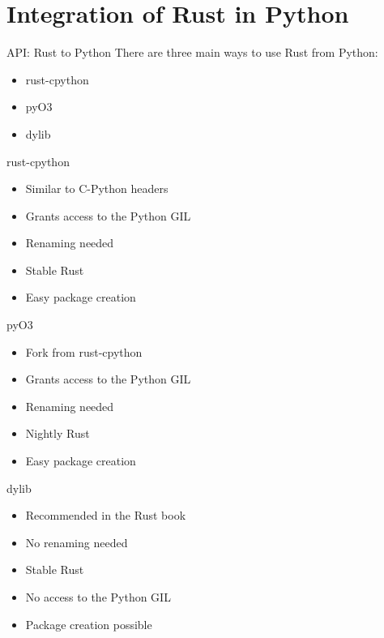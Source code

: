
\section{Integration of Rust in Python}


\begin{frame}[c]{API: Rust to Python}
    There are three main ways to use Rust from Python:
    \pause
    \begin{itemize}[<+->]
        \item rust-cpython
        \item pyO3
        \item dylib
    \end{itemize}
\end{frame}

\begin{frame}[c]{rust-cpython}
    \begin{itemize}[<+(1)->]
        \item Similar to C-Python headers
        \item Grants access to the Python GIL
        \item Renaming needed
        \item Stable Rust
        \item Easy package creation
    \end{itemize}
\end{frame}


\begin{frame}[c]{pyO3}
    \begin{itemize}[<+(1)->]
        \item Fork from rust-cpython
        \item Grants access to the Python GIL
        \item Renaming needed
        \item Nightly Rust
        \item Easy package creation
    \end{itemize}
\end{frame}


\begin{frame}[c]{dylib}
    \begin{itemize}[<+(1)->]
        \item Recommended in the Rust book
        \item No renaming needed
        \item Stable Rust
        \item No access to the Python GIL
        \item Package creation possible
    \end{itemize}
\end{frame}



